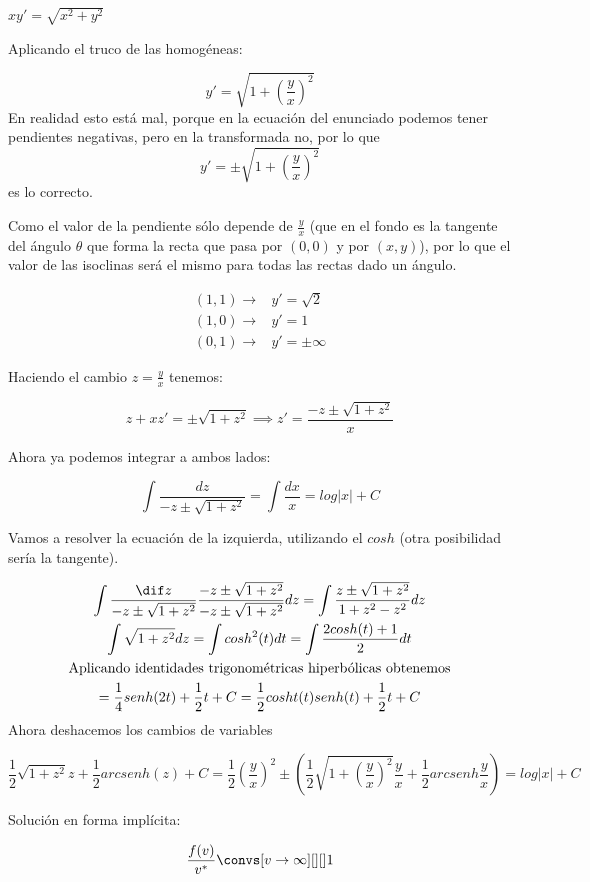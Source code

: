 \documentclass[nochap]{apuntes}
\begin{document}
\begin{problem}[5]
\ppart
\ppart $xy'=\sqrt{x^2+y^2}$
\solution
\spart

\spart Aplicando el truco de las homogéneas:

\[y' = \sqrt{1+\left(\frac{y}{x}\right)^2}\]
En realidad esto está mal, porque en la ecuación del enunciado podemos tener pendientes negativas, pero en la transformada no, por lo que 
\[y' = \pm\sqrt{1+\left(\frac{y}{x}\right)^2}\] es lo correcto.

Como el valor de la pendiente sólo depende de $\frac{y}{x}$ (que en el fondo es la tangente del ángulo $\theta$ que forma la recta que pasa por $(0,0)$ y por $(x,y)$), por lo que el valor de las isoclinas será el mismo para todas las rectas dado un ángulo.

\[\begin{array}{|cc|}
(1,1) \to &y' = \sqrt{2}\\
(1,0) \to &y'=1\\
(0,1) \to &y'=\pm\infty
\end{array}\]

Haciendo el cambio $z=\frac{y}{x}$ tenemos:

\[z+xz'=\pm\sqrt{1+z^2} \implies z'=\frac{-z\pm\sqrt{1+z^2}}{x}\]

Ahora ya podemos integrar a ambos lados:

\[\int \frac{d z}{-z\pm\sqrt{1+z^2}} = \int\frac{dx}{x} = log |x| + C\]

Vamos a resolver la ecuación de la izquierda, utilizando el $cosh$ (otra posibilidad sería la tangente).

\begin{gather*}
\int \frac{\dif z}{-z\pm\sqrt{1+z^2}} \frac{-z\pm\sqrt{1+z^2}}{-z\pm\sqrt{1+z^2}} dz = \int \frac{z\pm\sqrt{1+z^2}}{1 + z^2-z^2}dz\\
\int\sqrt{1+z^2}dz = \int cosh^2(t)dt = \int \frac{2cosh(t) + 1}{2}dt\\
\text{Aplicando identidades trigonométricas hiperbólicas obtenemos}\\
= \frac{1}{4}senh(2t) + \frac{1}{2}t + C = \frac{1}{2}cosht(t)senh(t) + \frac{1}{2}t + C
\end{gather*}
Ahora deshacemos los cambios de variables

\[\frac{1}{2}\sqrt{1+z^2}z + \frac{1}{2}arcsenh(z) + C = \frac{1}{2} \left(\frac{y}{x}\right)^2 \pm \left(\frac{1}{2}\sqrt{1+\left(\frac{y}{x}\right)^2}\frac{y}{x}+\frac{1}{2}arcsenh\frac{y}{x}\right) = log|x|+C\]

Solución en forma implícita:

\[\frac{f(v)}{v^*} \convs[v\to\infty][][] 1\]


\end{problem}
\end{document}

